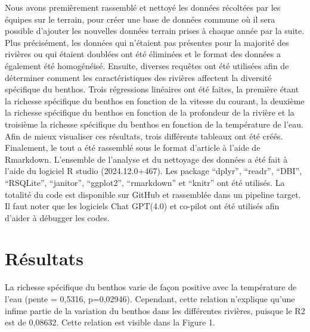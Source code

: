 \documentclass[9pt,twocolumn,twoside,final]{pnas-new}
\begin{document}
Nous avons premièrement rassemblé et nettoyé les données récoltées par
les équipes sur le terrain, pour créer une base de données commune où il
sera possible d'ajouter les nouvelles données terrain prises à chaque
année par la suite. Plus précisément, les données qui n'étaient pas
présentes pour la majorité des rivières ou qui étaient doublées ont été
éliminées et le format des données a également été homogénéisé. Ensuite,
diverses requêtes ont été utilisées afin de déterminer comment les
caractéristiques des rivières affectent la diversité spécifique du
benthos. Trois régressions linéaires ont été faites, la première étant
la richesse spécifique du benthos en fonction de la vitesse du courant,
la deuxième la richesse spécifique du benthos en fonction de la
profondeur de la rivière et la troisième la richesse spécifique du
benthos en fonction de la température de l'eau. Afin de mieux visualiser
ces résultats, trois différents tableaux ont été créés. Finalement, le
tout a été rassemblé sous le format d'article à l'aide de Rmarkdown.
L'ensemble de l'analyse et du nettoyage des données a été fait à l'aide
du logiciel R studio (2024.12.0+467). Les package ``dplyr'', ``readr'',
``DBI'', ``RSQLite'', ``janitor'', ``ggplot2'', ``rmarkdown'' et
``knitr'' ont été utilisés. La totalité du code est disponible sur
GitHub et rassemblée dans un pipeline target. Il faut noter que les
logiciels Chat GPT(4.0) et co-pilot ont été utilisés afin d'aider à
débugger les codes.

\section{Résultats}\label{ruxe9sultats}

La richesse spécifique du benthos varie de façon positive avec la
température de l'eau (pente = 0,5316, p=0,02946). Cependant, cette
relation n'explique qu'une infime partie de la variation du benthos dans
les différentes rivières, puisque le R2 est de 0,08632. Cette relation
est visible dans la Figure 1.
\end{document}

